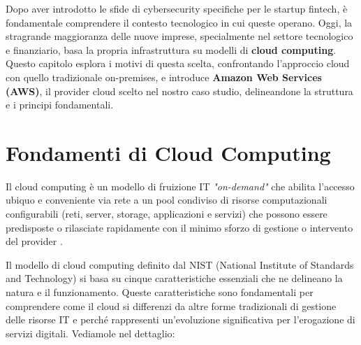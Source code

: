 Dopo aver introdotto le sfide di cybersecurity specifiche per le startup fintech, è fondamentale comprendere il contesto tecnologico in cui queste operano. Oggi, la stragrande maggioranza delle nuove imprese, specialmente nel settore tecnologico e finanziario, basa la propria infrastruttura su modelli di \textbf{cloud computing}. Questo capitolo esplora i motivi di questa scelta, confrontando l'approccio cloud con quello tradizionale on-premises, e introduce \textbf{Amazon Web Services (AWS)}, il provider cloud scelto nel nostro caso studio, delineandone la struttura e i principi fondamentali.
\section{Fondamenti di Cloud Computing}
Il cloud computing è un modello di fruizione IT \textit{"on-demand"} che abilita l'accesso ubiquo e conveniente via rete a un pool condiviso di risorse computazionali configurabili (reti, server, storage, applicazioni e servizi) che possono essere predisposte o rilasciate rapidamente con il minimo sforzo di gestione o intervento del provider \cite{nist800-145}.

Il modello di cloud computing definito dal NIST (National Institute of Standards and Technology) si basa su cinque caratteristiche essenziali che ne delineano la natura e il funzionamento. Queste caratteristiche sono fondamentali per comprendere come il cloud si differenzi da altre forme tradizionali di gestione delle risorse IT e perché rappresenti un'evoluzione significativa per l'erogazione di servizi digitali. Vediamole nel dettaglio:

